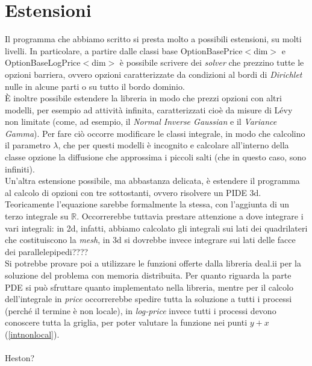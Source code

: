 \documentclass[a4paper,10pt]{report}
\theoremstyle{plain}
\theoremstyle{definition}
\theoremstyle{remark}
\begin{document}
\chapter{Estensioni}
Il programma che abbiamo scritto si presta molto a possibili estensioni, su molti livelli. In particolare, a partire dalle classi base \textsf{OptionBasePrice$<$dim$>$} e \textsf{OptionBaseLogPrice$<$dim$>$} \`e possibile scrivere dei \emph{solver} che prezzino tutte le opzioni barriera, ovvero opzioni caratterizzate da condizioni al bordi di \emph{Dirichlet} nulle in alcune parti o su tutto il bordo dominio.\\\`E inoltre possibile estendere la libreria in modo che prezzi opzioni con altri modelli, per esempio ad attivit\`a infinita, caratterizzati cio\`e da misure di L\'evy non limitate (come, ad esempio, il \emph{Normal Inverse Gaussian} e il \emph{Variance Gamma}). Per fare ci\`o occorre modificare le classi integrale, in modo che calcolino il parametro $\lambda$, che per questi modelli \`e incognito e calcolare all'interno della classe opzione la diffusione che approssima i piccoli salti (che in questo caso, sono infiniti).\\Un'altra estensione possibile, ma abbastanza delicata, \`e estendere il programma al calcolo di opzioni con tre sottostanti, ovvero risolvere un PIDE 3d. Teoricamente l'equazione sarebbe formalmente la stessa, con l'aggiunta di un terzo integrale su $\mathbb{R}$. Occorrerebbe tuttavia prestare attenzione a dove integrare i vari integrali: in 2d, infatti, abbiamo calcolato gli integrali sui lati dei quadrilateri che costituiscono la \emph{mesh}, in 3d si dovrebbe invece integrare sui lati delle facce dei parallelepipedi????\\Si potrebbe provare poi a utilizzare le funzioni offerte dalla libreria \textsf{deal.ii} per la soluzione del problema con memoria distribuita. Per quanto riguarda la parte PDE si pu\`o sfruttare quanto implementato nella libreria, mentre per il calcolo dell'integrale in \emph{price} occorrerebbe spedire tutta la soluzione a tutti i processi (perch\'e il termine \`e non locale), in \emph{log-price} invece tutti i processi devono conoscere tutta la griglia, per poter valutare la funzione nei punti $y+x$ (\ref{intnonlocal}).\\\\
Heston?
\clearpage
{}


\end{document}
